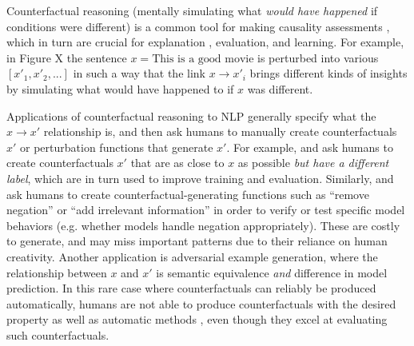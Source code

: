 Counterfactual reasoning (mentally simulating what \emph{would have happened} if conditions were different) is a common tool for making causality assessments \cite{kahneman}, which in turn are crucial for explanation \cite{miller}, evaluation, and learning. For example, in Figure X the sentence $x = \text{This is a good movie}$ is perturbed into various $[x'_1, x'_2, ...]$ in such a way that the link $x \rightarrow x'_i$ brings different kinds of insights by simulating what would have happened to if $x$ was different.

Applications of counterfactual reasoning to NLP generally specify what the $x \rightarrow x'$ relationship is, and then ask humans to manually create counterfactuals $x'$ or perturbation functions that generate $x'$.
For example, \citet{gardner2020contrast} and \citet{kaushik2019learning} ask humans to create counterfactuals $x'$ that are as close to $x$ as possible \emph{but have a different label}, which are in turn used to improve training and evaluation. Similarly, \citet{wu2019errudite} and \citet{checklist:acl20} ask humans to create counterfactual-generating functions such as ``remove negation'' or ``add irrelevant information'' in order to verify or test specific model behaviors (e.g. whether models handle negation appropriately).
These are costly to generate, and may miss important patterns due to their reliance on human creativity.
Another application is adversarial example generation, where the relationship between $x$ and $x'$ is semantic equivalence \emph{and} difference in model prediction\cite{iyyer2018adversarial, ribeiro2018semantically}. In this rare case where counterfactuals can reliably be produced automatically, humans are not able to produce counterfactuals with the desired property as well as automatic methods  \cite{ribeiro2018semantically}, even though they excel at evaluating such counterfactuals.

